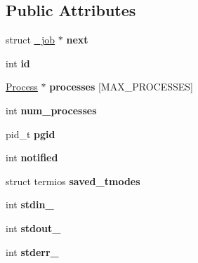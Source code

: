 \subsection*{Public Attributes}
\begin{DoxyCompactItemize}
\item 
\hypertarget{struct__job_a9f9d25a2f3ae560112e1d80cec67346c}{struct \hyperlink{struct__job}{\-\_\-job} $\ast$ {\bfseries next}}\label{struct__job_a9f9d25a2f3ae560112e1d80cec67346c}

\item 
\hypertarget{struct__job_a0a95a3cbd137e9af13918781cd735e19}{int {\bfseries id}}\label{struct__job_a0a95a3cbd137e9af13918781cd735e19}

\item 
\hypertarget{struct__job_a640f51218f6cea593af3b726243a1ba5}{\hyperlink{struct__process}{Process} $\ast$ {\bfseries processes} \mbox{[}M\-A\-X\-\_\-\-P\-R\-O\-C\-E\-S\-S\-E\-S\mbox{]}}\label{struct__job_a640f51218f6cea593af3b726243a1ba5}

\item 
\hypertarget{struct__job_ae270f3db5f654203eafbc21b5d7fa903}{int {\bfseries num\-\_\-processes}}\label{struct__job_ae270f3db5f654203eafbc21b5d7fa903}

\item 
\hypertarget{struct__job_a1e2f3ed455c7dad69db4b432ce5a92e5}{pid\-\_\-t {\bfseries pgid}}\label{struct__job_a1e2f3ed455c7dad69db4b432ce5a92e5}

\item 
\hypertarget{struct__job_a8931b8641a21e161f761ac1be42b56c9}{int {\bfseries notified}}\label{struct__job_a8931b8641a21e161f761ac1be42b56c9}

\item 
\hypertarget{struct__job_ad2c040a6b9d36d561301c9db54dfd12d}{struct termios {\bfseries saved\-\_\-tmodes}}\label{struct__job_ad2c040a6b9d36d561301c9db54dfd12d}

\item 
\hypertarget{struct__job_ae70cd46c40d32090f41e666fc01d9e72}{int {\bfseries stdin\-\_\-}}\label{struct__job_ae70cd46c40d32090f41e666fc01d9e72}

\item 
\hypertarget{struct__job_aa1b25162b95a558939e61d036e443e0f}{int {\bfseries stdout\-\_\-}}\label{struct__job_aa1b25162b95a558939e61d036e443e0f}

\item 
\hypertarget{struct__job_a593b516712519cdfa2c2a64bb51b4e07}{int {\bfseries stderr\-\_\-}}\label{struct__job_a593b516712519cdfa2c2a64bb51b4e07}


\end{DoxyCompactItemize}
